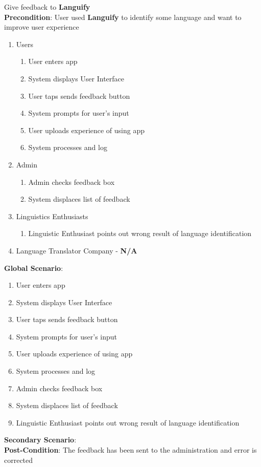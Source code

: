 \item Give feedback to \textbf{Languify}
	\\ \textbf{Precondition}: User used \textbf{Languify} to identify some language and want to improve user experience
	\begin{enumerate}[{\bf VP1.}]
		\item Users
			\begin{enumerate}[{\bf 1.}]
				\item User enters app
				\item System displays User Interface
				\item User taps sends feedback button
				\item System prompts for user’s input
				\item User uploads experience of using app
				\item System processes and log
			\end{enumerate}
		\item Admin
			\begin{enumerate}[{\bf 1.}]
				\item Admin checks feedback box
				\item System displaces list of feedback
			\end{enumerate}
		\item Linguistics Enthusiasts
		\begin{enumerate}[{\bf 1.}]
			\item Linguistic Enthusiast points out wrong result of language identification
		\end{enumerate}
		\item Language Translator Company - \textbf{N/A}
	\end{enumerate}
	\textbf{Global Scenario}:
	\begin{enumerate}[{\bf 1.}]
		\item User enters app
		\item System displays User Interface
		\item User taps sends feedback button
		\item System prompts for user’s input
		\item User uploads experience of using app
		\item System processes and log
		\item Admin checks feedback box
		\item System displaces list of feedback
		\item Linguistic Enthusiast points out wrong result of language identification
	\end{enumerate}
	\textbf{Secondary Scenario}:
	\\ \textbf{Post-Condition}: The feedback has been sent to the administration and error is corrected